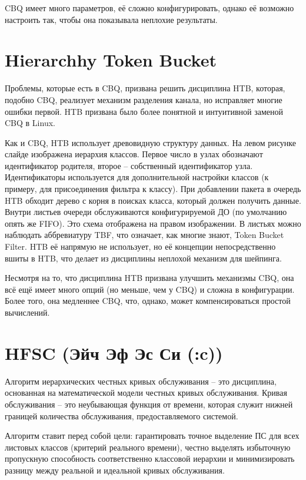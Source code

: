 \documentclass[12pt]{ncc}
\begin{document}
	CBQ имеет много параметров, её сложно конфигурировать, однако
	её возможно настроить так, чтобы она показывала неплохие 
	результаты.

	\section{Hierarchhy Token Bucket}

	Проблемы, которые есть в CBQ, призвана решить дисциплина HTB, которая,
	подобно CBQ, реализует механизм разделения канала, но исправляет многие
	ошибки первой. HTB призвана было более понятной и интуитивной заменой
	CBQ в Linux.

	Как и CBQ, HTB использует древовидную структуру данных. На левом рисунке
	слайде изображена иерархия классов. Первое число в узлах обозначают
	идентификатор родителя, второе -- собственный идентификатор узла.
	Идентификаторы используется для дополнительной настройки классов
	(к примеру, для присоединения фильтра к классу). 
	При добавлении пакета в очередь HTB обходит дерево с корня в
	поисках класса, который должен получить данные. Внутри листьев
	очереди обслуживаются конфигурируемой ДО (по умолчанию опять же FIFO).
	Это схема отображена на правом изображении. В листьях можно наблюдать
	аббревиатуру TBF, что означает, как многие знают, Token Bucket Filter.
	HTB её напрямую не использует, но её концепции непосредственно вшиты
	в HTB, что делает из дисциплины неплохой механизм для шейпинга.

	Несмотря на то, что дисциплина HTB призвана улучшить механизмы CBQ,
	она всё ещё имеет много опций (но меньше, чем у CBQ) и сложна
	в конфигурации. Более того, она медленнее CBQ, что, однако,
	может компенсироваться простой вычислений.
	
	\section{HFSC (Эйч Эф Эс Си (:c))}

	Алгоритм иерархических честных кривых обслуживания -- это дисциплина,
	основанная на математической модели честных кривых обслуживания.
	Кривая обслуживания -- это неубывающая функция от времени,
	которая служит нижней границей количества обслуживания, предоставляемого
	системой. 

	Алгоритм ставит перед собой цели: гарантировать точное выделение ПС
	для всех листовых классов (критерий реального времени),
	честно выделять избыточную пропускную способность соответственно
	классовой иерархии и минимизировать разницу между реальной и идеальной
	кривых обслуживания.
\end{document}
